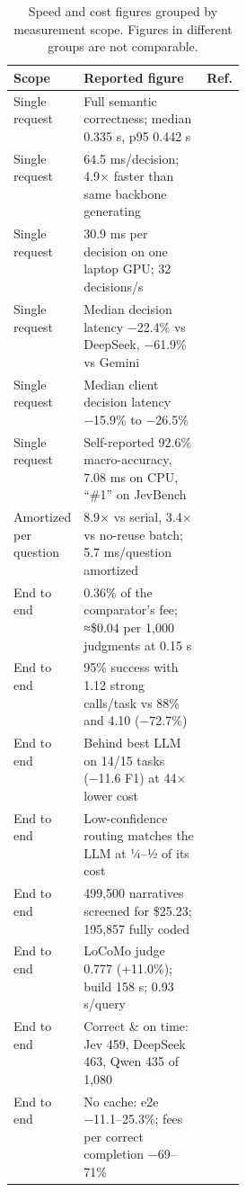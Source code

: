 \begin{table}[tbp]
\centering\footnotesize
\caption{Speed and cost figures grouped by measurement scope. Figures in different groups are not comparable.}\label{tab:scopes}
\begin{tabularx}{\linewidth}{p{0.2\linewidth}Xp{0.1\linewidth}}
\toprule
\textbf{Scope} & \textbf{Reported figure} & \textbf{Ref.} \\
\midrule
Single request & Full semantic correctness; median 0.335 s, p95 0.442 s & \citep{arxiv2609_24965} \\
Single request & 64.5 ms/decision; 4.9× faster than same backbone generating & \citep{arxiv2609_23959} \\
Single request & 30.9 ms per decision on one laptop GPU; 32 decisions/s & \citep{arxiv2609_23886} \\
Single request & Median decision latency −22.4\% vs DeepSeek, −61.9\% vs Gemini & \citep{arxiv2609_23136} \\
Single request & Median client decision latency −15.9\% to −26.5\% & \citep{arxiv2609_22753} \\
Single request & Self-reported 92.6\% macro-accuracy, 7.08 ms on CPU, “\#1” on JevBench & \citep{arxiv2609_25498} \\
Amortized per question & 8.9× vs serial, 3.4× vs no-reuse batch; 5.7 ms/question amortized & \citep{arxiv2609_25845} \\
End to end & 0.36\% of the comparator’s fee; ≈\$0.04 per 1,000 judgments at 0.15 s & \citep{arxiv2609_26550} \\
End to end & 95\% success with 1.12 strong calls/task vs 88\% and 4.10 (−72.7\%) & \citep{arxiv2609_26532} \\
End to end & Behind best LLM on 14/15 tasks (−11.6 F1) at 44× lower cost & \citep{arxiv2609_24574} \\
End to end & Low-confidence routing matches the LLM at ¼–½ of its cost & \citep{arxiv2609_24574} \\
End to end & 499,500 narratives screened for \$25.23; 195,857 fully coded & \citep{arxiv2609_24052} \\
End to end & LoCoMo judge 0.777 (+11.0\%); build 158 s; 0.93 s/query & \citep{arxiv2609_23986} \\
End to end & Correct \& on time: Jev 459, DeepSeek 463, Qwen 435 of 1,080 & \citep{arxiv2609_23136} \\
End to end & No cache: e2e −11.1–25.3\%; fees per correct completion −69–71\% & \citep{arxiv2609_22753} \\

\end{tabularx}
\end{table}
